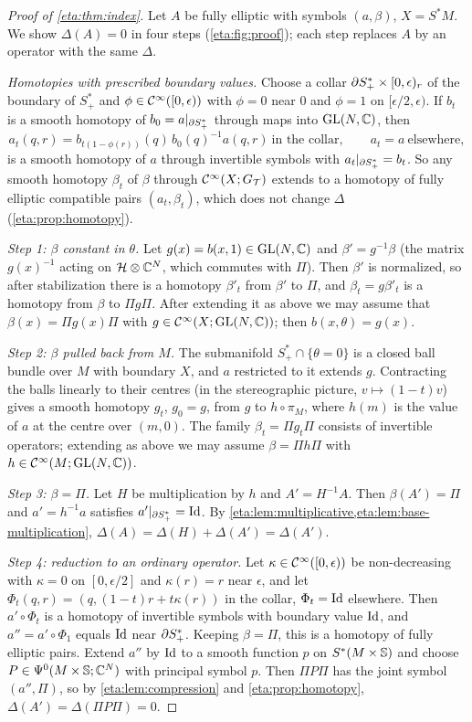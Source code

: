 \begin{proof}[Proof of \cref{eta:thm:index}] Let $A$ be fully elliptic with symbols
$(a,\beta)$, $X=S^*M$. We show $\Delta(A)=0$ in four steps (\cref{eta:fig:proof});
each step replaces $A$ by an operator with the same $\Delta$.

\emph{Homotopies with prescribed boundary values.} Choose a collar
$\partial S^*_+\times[0,\epsilon)_r$ of the boundary of $S^*_+$ and $\phi\in\mathcal{C}^\infty([0,\epsilon))$ with
$\phi=0$ near $0$ and $\phi=1$ on $[\epsilon/2,\epsilon)$. If $b_t$ is a smooth homotopy of
$b_0=a|_{\partial S^*_+}$ through maps into $\operatorname{GL}(N,\mathbb{C})$, then
\[
a_t(q,r)=b_{t(1-\phi(r))}(q)\,b_0(q)^{-1}a(q,r)\ \text{in the collar},\qquad
a_t=a\ \text{elsewhere},
\]
is a smooth homotopy of $a$ through invertible symbols with $a_t|_{\partial S^*_+}=b_t$. So any
smooth homotopy $\beta_t$ of $\beta$ through $\mathcal{C}^\infty(X;G_{\mathcal{T}})$ extends to a homotopy of fully
elliptic compatible pairs $(a_t,\beta_t)$, which does not change $\Delta$
(\cref{eta:prop:homotopy}).

\emph{Step 1: $\beta$ constant in $\theta$.} Let $g(x)=b(x,1)\in\operatorname{GL}(N,\mathbb{C})$ and
$\beta'=g^{-1}\beta$ (the matrix $g(x)^{-1}$ acting on $\mathcal{H}\otimes\mathbb{C}^N$, which
commutes with $\Pi$). Then $\beta'$ is normalized, so after stabilization there is a
homotopy $\beta'_t$ from $\beta'$ to $\Pi$, and $\beta_t=g\beta'_t$ is a homotopy from $\beta$
to $\Pi g\Pi$. After extending it as above we may assume that $\beta(x)=\Pi g(x)\Pi$
with $g\in\mathcal{C}^\infty(X;\operatorname{GL}(N,\mathbb{C}))$; then $b(x,\theta)=g(x)$.

\emph{Step 2: $\beta$ pulled back from $M$.} The submanifold $S^*_+\cap\{\theta=0\}$ is
a closed ball bundle over $M$ with boundary $X$, and $a$ restricted to it extends $g$.
Contracting the balls linearly to their centres (in the stereographic picture,
$v\mapsto(1-t)v$) gives a smooth homotopy $g_t$, $g_0=g$, from $g$ to $h\circ\pi_M$,
where $h(m)$ is the value of $a$ at the centre over $(m,0)$. The family
$\beta_t=\Pi g_t\Pi$ consists of invertible operators; extending as above we may assume
$\beta=\Pi h\Pi$ with $h\in\mathcal{C}^\infty(M;\operatorname{GL}(N,\mathbb{C}))$.

\emph{Step 3: $\beta=\Pi$.} Let $H$ be multiplication by $h$ and $A'=H^{-1}A$. Then
$\beta(A')=\Pi$ and $a'=h^{-1}a$ satisfies $a'|_{\partial S^*_+}=\operatorname{Id}$. By
\cref{eta:lem:multiplicative,eta:lem:base-multiplication},
$\Delta(A)=\Delta(H)+\Delta(A')=\Delta(A')$.

\emph{Step 4: reduction to an ordinary operator.} Let $\kappa\in\mathcal{C}^\infty([0,\epsilon))$ be
non-decreasing with $\kappa=0$ on $[0,\epsilon/2]$ and $\kappa(r)=r$ near $\epsilon$, and
let $\Phi_t(q,r)=(q,(1-t)r+t\kappa(r))$ in the collar, $\Phi_t=\operatorname{Id}$ elsewhere. Then
$a'\circ\Phi_t$ is a homotopy of invertible symbols with boundary value $\operatorname{Id}$, and
$a''=a'\circ\Phi_1$ equals $\operatorname{Id}$ near $\partial S^*_+$. Keeping $\beta=\Pi$, this is a homotopy
of fully elliptic pairs. Extend $a''$ by $\operatorname{Id}$ to a smooth function $p$ on
$S^*(M\times\mathbb{S})$ and choose $P\in\Psi^{0}(M\times\mathbb{S};\mathbb{C}^N)$ with principal symbol
$p$. Then $\Pi P\Pi$ has the joint symbol $(a'',\Pi)$, so by
\cref{eta:lem:compression} and \cref{eta:prop:homotopy}, $\Delta(A')=\Delta(\Pi P\Pi)=0$.
\end{proof}

